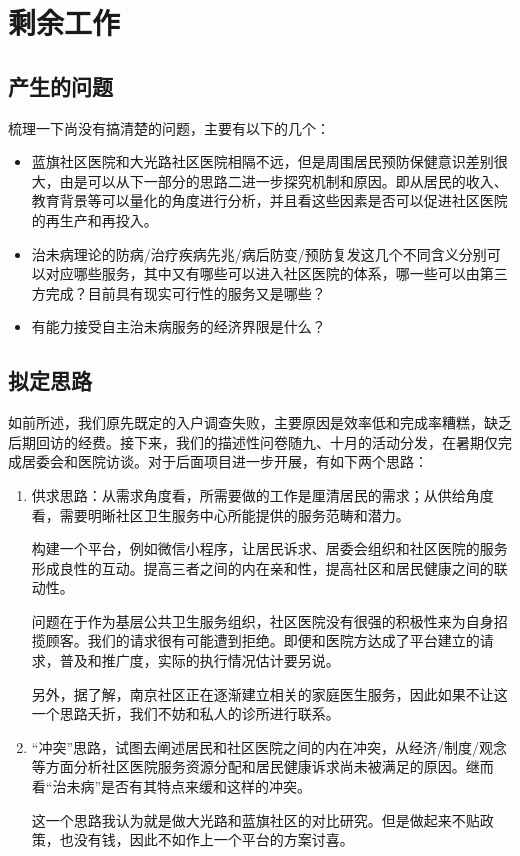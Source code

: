 \documentclass{article}
\begin{document}
    \section{剩余工作}
    \subsection{产生的问题}
    梳理一下尚没有搞清楚的问题，主要有以下的几个：
    \begin{itemize}
        \item 蓝旗社区医院和大光路社区医院相隔不远，但是周围居民预防保健意识差别很大，由是可以从下一部分的思路二进一步探究机制和原因。即从居民的收入、教育背景等可以量化的角度进行分析，并且看这些因素是否可以促进社区医院的再生产和再投入。
        \item 治未病理论的防病/治疗疾病先兆/病后防变/预防复发这几个不同含义分别可以对应哪些服务，其中又有哪些可以进入社区医院的体系，哪一些可以由第三方完成？目前具有现实可行性的服务又是哪些？
        \item 有能力接受自主治未病服务的经济界限是什么？
   \end{itemize}
    \subsection{拟定思路}
    如前所述，我们原先既定的入户调查失败，主要原因是效率低和完成率糟糕，缺乏后期回访的经费。接下来，我们的描述性问卷随九、十月的活动分发，在暑期仅完成居委会和医院访谈。对于后面项目进一步开展，有如下两个思路：
    
    \begin{enumerate}
    \item 供求思路：从需求角度看，所需要做的工作是厘清居民的需求；从供给角度看，需要明晰社区卫生服务中心所能提供的服务范畴和潜力。
    
    构建一个平台，例如微信小程序，让居民诉求、居委会组织和社区医院的服务形成良性的互动。提高三者之间的内在亲和性，提高社区和居民健康之间的联动性。
    
    问题在于作为基层公共卫生服务组织，社区医院没有很强的积极性来为自身招揽顾客。我们的请求很有可能遭到拒绝。即便和医院方达成了平台建立的请求，普及和推广度，实际的执行情况估计要另说。
    
    另外，据了解，南京社区正在逐渐建立相关的家庭医生服务，因此如果不让这一个思路夭折，我们不妨和私人的诊所进行联系。
    
    \item “冲突”思路，试图去阐述居民和社区医院之间的内在冲突，从经济/制度/观念等方面分析社区医院服务资源分配和居民健康诉求尚未被满足的原因。继而看“治未病”是否有其特点来缓和这样的冲突。
    
    这一个思路我认为就是做大光路和蓝旗社区的对比研究。但是做起来不贴政策，也没有钱，因此不如作上一个平台的方案讨喜。
\end{enumerate}
\end{document}
